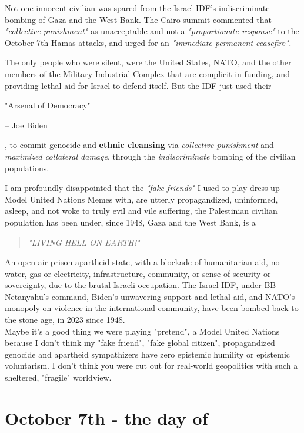 \documentclass[16pt,openany,oneside]{book}
\begin{document}
Not one innocent civilian was spared from the Israel IDF's indiscriminate bombing of Gaza and the West Bank. The Cairo summit commented that  
\emph{"collective punishment"} 
as unacceptable and not a 
    \emph{"proportionate response"} 
to the October 7th Hamas attacks, and urged for an 
    \emph{"immediate permanent ceasefire".}

The only people who were silent, were the United States, NATO, and the other members of the Military Industrial Complex that are complicit in funding, and providing lethal aid for Israel to defend itself. But the IDF just used their 

\epigraph{"Arsenal of Democracy"}{-- Joe Biden \cite{pbs2023biden}}

, to commit genocide and \textbf{ethnic cleansing} via \textit{collective punishment} and \textit{maximized collateral damage}, through the \textit{indiscriminate} bombing of the civilian populations.

I am profoundly disappointed that the \textit{"fake friends"} I used to play dress-up Model United Nations Memes with, are utterly propagandized, uninformed, asleep, and not woke to truly evil and vile suffering, the Palestinian civilian population has been under, since 1948, Gaza and the West Bank, is a
\begin{quote}
    \emph{"LIVING HELL ON EARTH!"}
\end{quote}
An open-air prison apartheid state, with a blockade of humanitarian aid, no water, gas or electricity, infrastructure, community, or sense of security or sovereignty, due to the brutal Israeli occupation. The Israel IDF, under BB Netanyahu's command, Biden's unwavering support and lethal aid, and NATO's monopoly on violence in the international community, have been bombed back to the stone age, in 2023 since 1948.
\\
Maybe it's a good thing we were playing "pretend", a Model United Nations because I don't think my "fake friend", "fake global citizen", propagandized genocide and apartheid sympathizers have zero epistemic humility or epistemic voluntarism. I don't think you were cut out for real-world geopolitics with such a sheltered, "fragile" worldview.

\chapter{October 7th - the day of}
\end{document}
